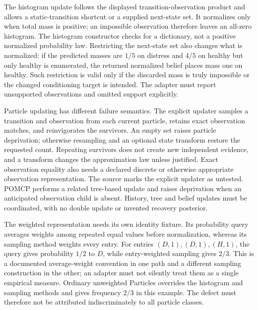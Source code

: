 The histogram update follows the displayed transition-observation product and
allows a static-transition shortcut or a supplied next-state set. It normalizes
only when total mass is positive; an impossible observation therefore leaves
an all-zero histogram. The histogram constructor checks for a dictionary, not
a positive normalized probability law. Restricting the next-state set also
changes what is normalized: if the predicted masses are $1/5$ on distress and
$4/5$ on healthy but only healthy is enumerated, the returned normalized belief
places mass one on healthy. Such restriction is valid only if the discarded
mass is truly impossible or the changed conditioning target is intended.
The adapter must report unsupported observations and omitted support explicitly.
\cite{exec23_pomdppy_sources,exec23_pomdppy_reference}

Particle updating has different failure semantics. The explicit updater samples
a transition and observation from each current particle, retains exact
observation matches, and reinvigorates the survivors. An empty set raises
particle deprivation; otherwise resampling and an optional state transform
restore the requested count. Repeating survivors does not create new
independent evidence, and a transform changes the approximation law unless
justified. Exact observation equality also needs a declared discrete or
otherwise appropriate observation representation. The source marks the explicit
updater as untested. POMCP performs a related tree-based update and raises
deprivation when an anticipated observation child is absent. History, tree and
belief updates must be coordinated, with no double update or invented recovery
posterior. \cite{exec23_pomdppy_sources}

The weighted representation needs its own identity fixture. Its probability
query averages weights among repeated equal values before normalization,
whereas its sampling method weights every entry. For entries $(D,1),(D,1),(H,1)$,
the query gives probability $1/2$ to $D$, while entry-weighted sampling gives
$2/3$. This is a documented average-weight convention in one path and a
different sampling construction in the other; an adapter must not silently
treat them as a single empirical measure. Ordinary unweighted Particles
overrides the histogram and sampling methods and gives frequency $2/3$ in
this example. The defect must therefore not be attributed indiscriminately to
all particle classes. \cite{exec23_pomdppy_sources,exec23_pomdppy_reference}

